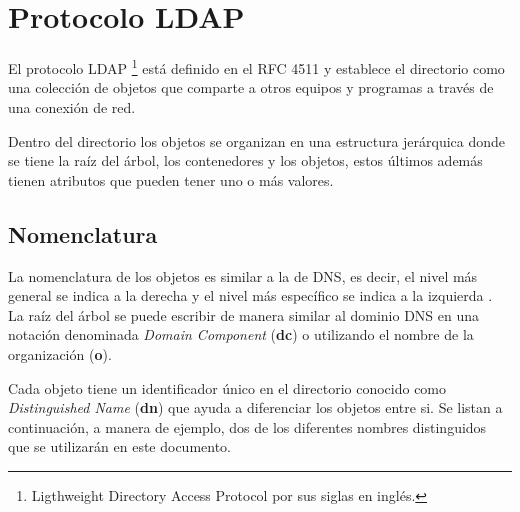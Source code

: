 \section {Protocolo \textsc{LDAP}}

El protocolo \textsc{LDAP} \footnote{Ligthweight Directory Access Protocol por sus siglas en ingl\'{e}s.} est\'{a} definido en el \textsc{RFC} 4511 \cite{_rfc_????-5} y establece el directorio como una colecci\'{o}n de objetos que comparte a otros equipos y programas a trav\'{e}s de una conexi\'{o}n de red.

Dentro del directorio los objetos se organizan en una estructura jer\'{a}rquica donde se tiene la ra\'{i}z del \'{a}rbol, los contenedores y los objetos, estos \'{u}ltimos adem\'{a}s tienen atributos que pueden tener uno o m\'{a}s valores.

  \subsection {Nomenclatura}

La nomenclatura de los objetos es similar a la de \textsc{DNS}, es decir, el nivel m\'{a}s general se indica a la derecha y el nivel m\'{a}s espec\'{i}fico se indica a la izquierda \cite{_appendix_????}. La ra\'{i}z del \'{a}rbol se puede escribir de manera similar al dominio \textsc{DNS} en una notaci\'{o}n denominada \textit{Domain Component} (\textbf{dc}) o utilizando el nombre de la organizaci\'{o}n (\textbf{o}).

\begin{table}[H]
\caption{Nomenclatura del nodo ra\'{i}z de \textsc{LDAP}}{}
\label{tab:nomenclatura-ldap-root}
\noindent{} %
\end{table}

Cada objeto tiene un identificador \'{u}nico en el directorio conocido como \textit{Distinguished Name} (\textbf{dn}) que ayuda a diferenciar los objetos entre si. Se listan a continuaci\'{o}n, a manera de ejemplo, dos de los diferentes nombres distinguidos que se utilizar\'{a}n en este documento.

